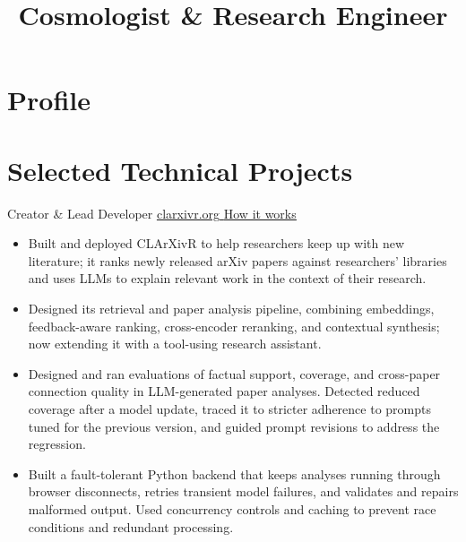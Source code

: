 \documentclass[11pt,a4paper,sans]{moderncv}
\title{Cosmologist \& Research Engineer}
\newcommand{\resumelink}[2]{%
	\href{#1}{%
		\textcolor{color1}{%
			\begingroup
			\setlength{\ULdepth}{1.5pt}%
			\uline{#2}%
			\endgroup
		}%
	}%
}
\begin{document}
\makecvtitle
\vspace{-0.8cm}

\section{Profile}

\section{Selected Technical Projects}

  {Creator \& Lead Developer}
  {\resumelink{https://clarxivr.org}{clarxivr.org}\hspace{1mm}\textbar\hspace{1mm}\resumelink{https://clarxivr.org/how-it-works}{How it works}}
  {}
  {}
  {\begin{itemize}
    \item Built and deployed CLArXivR to help researchers keep up with new literature; it ranks newly released arXiv papers against researchers’ libraries and uses LLMs to explain relevant work in the context of their research.
    \item Designed its retrieval and paper analysis pipeline, combining embeddings, feedback-aware ranking, cross-encoder reranking, and contextual synthesis; now extending it with a tool-using research assistant.
    \item Designed and ran evaluations of factual support, coverage, and cross-paper connection quality in LLM-generated paper analyses. Detected reduced coverage after a model update, traced it to stricter adherence to prompts tuned for the previous version, and guided prompt revisions to address the regression.
    \item Built a fault-tolerant Python backend that keeps analyses running through browser disconnects, retries transient model failures, and validates and repairs malformed output. Used concurrency controls and caching to prevent race conditions and redundant processing.
  \end{itemize}}
\end{document}
